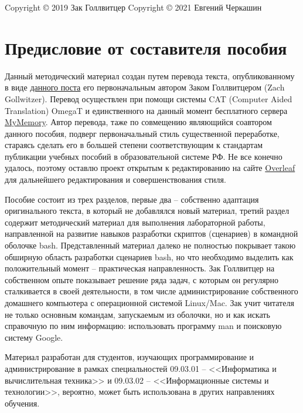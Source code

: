 \documentclass[12pt]{article}
\begin{document}
Copyright © 2019 Зак Голлвитцер
Copyright © 2021 Евгений Черкашин



\setcounter{tocdepth}{3}
\tableofcontents

\clearpage

\section*{Предисловие от составителя пособия}

Данный методический материал создан путем перевода текста, опубликованному в виде \href{https://zachgoll.github.io/blog/2019/bash-essentials/}{данного поста} его первоначальным автором Заком Голлвитцером (Zach Gollwitzer). Перевод осуществлен при помощи системы CAT (Computer Aided Translation) OmegaT и единственного на данный момент бесплатного сервера \href{https://mymemory.translated.net/}{MyMemory}. Автор перевода, таже по совмещению являющийся соавтором данного пособия, подверг первоначальный стиль существенной переработке, стараясь сделать его в большей степени соответствующим к стандартам публикации учебных пособий в образовательной системе РФ. Не все конечно удалось, поэтому оставлю проект открытым к редактированию на сайте \href{https://www.overleaf.com/project/602cc04c00be7fbbe118f862}{Overleaf} для дальнейшего редактирования и совершенствования стиля.

Пособие состоит из трех разделов, первые два -- собственно адаптация оригинального текста, в который не добавлялся новый материал, третий раздел содержит методический материал для выполнения лабораторной работы, направленной на развитие навыков разработки скриптов (сценариев) в командной оболочке bash. Представленный материал далеко не полностью покрывает такою обширную область разработки сценариев bash, но что необходимо выделить как положительный момент -- практическая направленность. Зак Голлвитцер на собственном опыте показывает решение ряда задач, с которым он регулярно сталкивается в своей деятельности, в том числе администрирование собственного домашнего компьютера с операционной системой Linux/Mac. Зак учит читателя не только основным командам, запускаемым из оболочки, но и как искать справочную по ним информацию: использовать программу man и поисковую систему Google.

Материал разработан для студентов, изучающих программирование и администрирование в рамках специальностей 09.03.01 -- <<Информатика и вычислительная техника>> и 09.03.02 -- <<Информационные системы и технологии>>, вероятно, может быть использована в других направлениях обучения.
\end{document}
